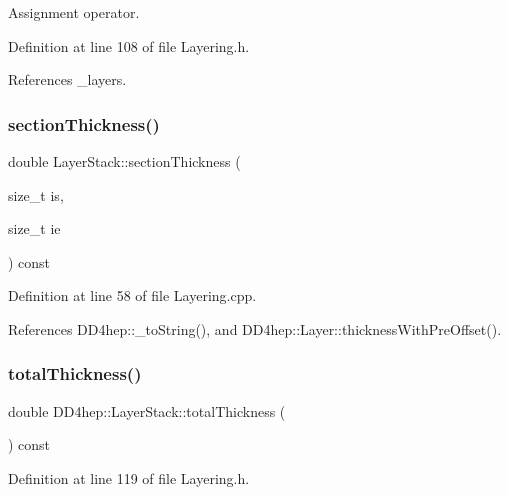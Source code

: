 Assignment operator. 



Definition at line 108 of file Layering.\+h.



References \+\_\+layers.

\hypertarget{class_d_d4hep_1_1_layer_stack_ae38858527f806b015bf6601c376a152d}{}\label{class_d_d4hep_1_1_layer_stack_ae38858527f806b015bf6601c376a152d} 
\subsubsection{\texorpdfstring{section\+Thickness()}{sectionThickness()}}
{\footnotesize\ttfamily double Layer\+Stack\+::section\+Thickness (\begin{DoxyParamCaption}\item[{size\+\_\+t}]{is,  }\item[{size\+\_\+t}]{ie }\end{DoxyParamCaption}) const}



Definition at line 58 of file Layering.\+cpp.



References D\+D4hep\+::\+\_\+to\+String(), and D\+D4hep\+::\+Layer\+::thickness\+With\+Pre\+Offset().

\hypertarget{class_d_d4hep_1_1_layer_stack_aead65ad7a1ac06f4977cdcfbda6d65b5}{}\label{class_d_d4hep_1_1_layer_stack_aead65ad7a1ac06f4977cdcfbda6d65b5} 
\subsubsection{\texorpdfstring{total\+Thickness()}{totalThickness()}}
{\footnotesize\ttfamily double D\+D4hep\+::\+Layer\+Stack\+::total\+Thickness (\begin{DoxyParamCaption}{ }\end{DoxyParamCaption}) const\hspace{0.3cm}{\ttfamily [inline]}}



Definition at line 119 of file Layering.\+h.



